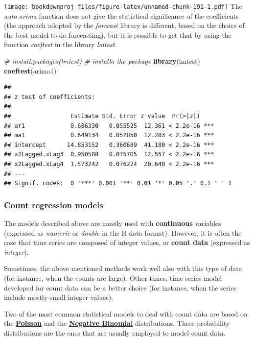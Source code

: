\documentclass[
]{article}
\newenvironment{Shaded}{\begin{snugshade}}{\end{snugshade}}
\newcommand{\CommentTok}[1]{\textcolor[rgb]{0.56,0.35,0.01}{\textit{#1}}}
\newcommand{\KeywordTok}[1]{\textcolor[rgb]{0.13,0.29,0.53}{\textbf{#1}}}
\newcommand{\NormalTok}[1]{#1}
\begin{document}
\texttt{[image: bookdownproj\_files/figure-latex/unnamed-chunk-191-1.pdf]}
The \emph{auto.arima} function does not give the statistical significance of the coefficients (the approach adopted by the \emph{forecast} library is different, based on the choice of the best model to do forecasting), but it is possible to get that by using the function \emph{coeftest} in the library \emph{lmtest}.

\begin{Shaded}
\begin{Highlighting}[]
\CommentTok{# install.packages(lmtest) # installa the package}
\KeywordTok{library}\NormalTok{(lmtest)}
\KeywordTok{coeftest}\NormalTok{(arima1)}
\end{Highlighting}
\end{Shaded}

\begin{verbatim}
## 
## z test of coefficients:
## 
##                 Estimate Std. Error z value  Pr(>|z|)    
## ar1             0.686330   0.055525  12.361 < 2.2e-16 ***
## ma1             0.649134   0.052850  12.283 < 2.2e-16 ***
## intercept      14.853152   0.360689  41.180 < 2.2e-16 ***
## x2Lagged.xLag3  0.950588   0.075705  12.557 < 2.2e-16 ***
## x2Lagged.xLag4  1.573242   0.076224  20.640 < 2.2e-16 ***
## ---
## Signif. codes:  0 '***' 0.001 '**' 0.01 '*' 0.05 '.' 0.1 ' ' 1
\end{verbatim}

\hypertarget{count-regression-models}{%
\subsubsection{Count regression models}\label{count-regression-models}}

The models described above are mostly used with \textbf{continuous} variables (expressed as \emph{numeric} or \emph{double} in the R data format). However, it is often the case that time series are composed of integer values, or \textbf{count data} (expressed as \emph{integer}).

Sometimes, the above mentioned methods work well also with this type of data (for instance, when the counts are large). Other times, time series model developed for count data can be a better choice (for instance, when the series include mostly small integer values).

Two of the most common statistical models to deal with count data are based on the \href{https://en.wikipedia.org/wiki/Poisson_distribution}{\textbf{Poisson}} and the \href{https://en.wikipedia.org/wiki/Negative_binomial_distribution}{\textbf{Negative Binomial}} distributions. These probability distributions are the ones that are usually employed to model count data.
\end{document}
